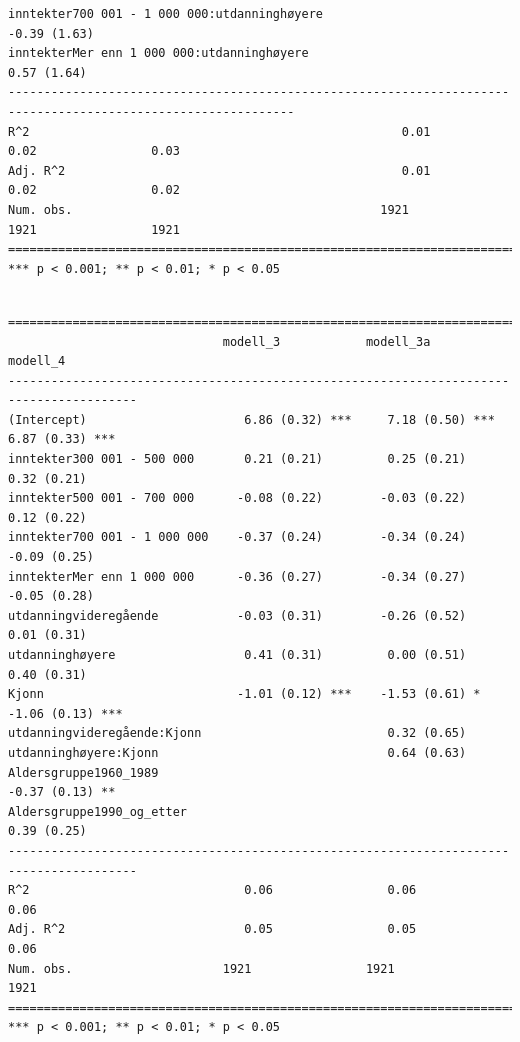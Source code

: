 \documentclass[
  12pt,
  letterpaper,
  DIV=11,
  numbers=noendperiod]{scrartcl}
\begin{document}
\begin{verbatim}
inntekter700 001 - 1 000 000:utdanninghøyere                                                  -0.39 (1.63)    
inntekterMer enn 1 000 000:utdanninghøyere                                                     0.57 (1.64)    
--------------------------------------------------------------------------------------------------------------
R^2                                                    0.01                0.02                0.03           
Adj. R^2                                               0.01                0.02                0.02           
Num. obs.                                           1921                1921                1921              
==============================================================================================================
*** p < 0.001; ** p < 0.01; * p < 0.05
\end{verbatim}

\newpage

\begin{verbatim}

========================================================================================
                              modell_3            modell_3a           modell_4          
----------------------------------------------------------------------------------------
(Intercept)                      6.86 (0.32) ***     7.18 (0.50) ***     6.87 (0.33) ***
inntekter300 001 - 500 000       0.21 (0.21)         0.25 (0.21)         0.32 (0.21)    
inntekter500 001 - 700 000      -0.08 (0.22)        -0.03 (0.22)         0.12 (0.22)    
inntekter700 001 - 1 000 000    -0.37 (0.24)        -0.34 (0.24)        -0.09 (0.25)    
inntekterMer enn 1 000 000      -0.36 (0.27)        -0.34 (0.27)        -0.05 (0.28)    
utdanningvideregående           -0.03 (0.31)        -0.26 (0.52)         0.01 (0.31)    
utdanninghøyere                  0.41 (0.31)         0.00 (0.51)         0.40 (0.31)    
Kjonn                           -1.01 (0.12) ***    -1.53 (0.61) *      -1.06 (0.13) ***
utdanningvideregående:Kjonn                          0.32 (0.65)                        
utdanninghøyere:Kjonn                                0.64 (0.63)                        
Aldersgruppe1960_1989                                                   -0.37 (0.13) ** 
Aldersgruppe1990_og_etter                                                0.39 (0.25)    
----------------------------------------------------------------------------------------
R^2                              0.06                0.06                0.06           
Adj. R^2                         0.05                0.05                0.06           
Num. obs.                     1921                1921                1921              
========================================================================================
*** p < 0.001; ** p < 0.01; * p < 0.05
\end{verbatim}
\end{document}
